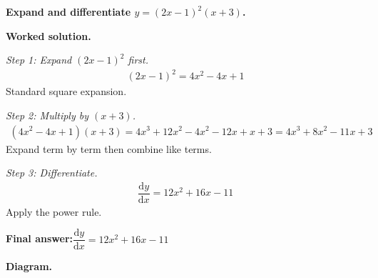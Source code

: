 \documentclass[11pt]{article}
\newcommand{\question}[1]{\par\medskip\noindent\textbf{#1}\par}
\begin{document}
\question{Expand and differentiate \( y = (2x - 1)^2 (x + 3) \).}

\textbf{Worked solution.}

\textit{Step 1: Expand \( (2x - 1)^2 \) first.}
\[\begin{gathered}
(2x-1)^2 = 4x^2 - 4x + 1
\end{gathered}\]
Standard square expansion.

\textit{Step 2: Multiply by \( (x + 3) \).}
\[\begin{gathered}
(4x^2 - 4x + 1)(x + 3) = 4x^3 + 12x^2 - 4x^2 - 12x + x + 3 = 4x^3 + 8x^2 - 11x + 3
\end{gathered}\]
Expand term by term then combine like terms.

\textit{Step 3: Differentiate.}
\[\begin{gathered}
\dfrac{\mathrm{d}y}{\mathrm{d}x} = 12x^2 + 16x - 11
\end{gathered}\]
Apply the power rule.

\begin{answerbox}
\textbf{Final answer:}\quad \(\displaystyle  \dfrac{\mathrm{d}y}{\mathrm{d}x} = 12x^2 + 16x - 11 \)
\end{answerbox}
\textbf{Diagram.}
\end{document}
